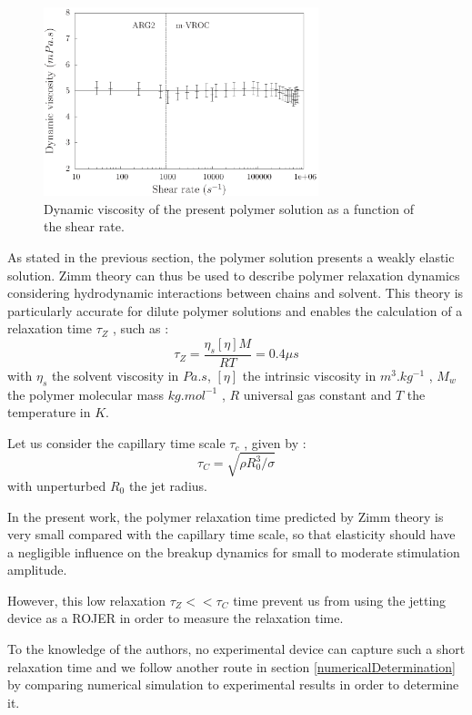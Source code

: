 \documentclass[twocolumn,10pt]{asme2ej}
\begin{document}
\begin{figure}[H]
    \centering
    \includegraphics[width=8cm]{./9651visco.eps}
    \caption{Dynamic viscosity of the present polymer solution as a function of the shear rate.}
    \label{beahaviorLaw}
\end{figure}

As stated in the previous section, the polymer solution presents a weakly elastic solution. Zimm theory can thus be used to describe polymer relaxation dynamics considering hydrodynamic interactions between chains and solvent. This theory is particularly accurate for dilute polymer solutions and enables the calculation of a relaxation time $\tau_Z$ , such as :
\begin{equation}
    \tau_Z = \frac{\eta_s [\eta] M}{RT} = 0.4 \mu s
    \label{zimm} 
\end{equation}
with $\eta_s$ the solvent viscosity in $Pa.s$, $[\eta]$ the intrinsic viscosity in $m^3.kg^{−1}$ , $M_w$ the
polymer molecular mass $kg.mol^{−1}$ , $R$ universal gas constant and $T$ the temperature in $K$.

Let us consider the capillary time scale $\tau_c$ , given by :
\begin{equation}
    \tau_C= \sqrt{\rho R_0^3 / \sigma}
\end{equation}
with unperturbed $R_0$ the jet radius. 

In the present work, the polymer relaxation time predicted by Zimm theory is very small compared with the capillary time scale, so that elasticity should have a negligible influence on the breakup dynamics for small to moderate stimulation amplitude. 

However, this low relaxation $\tau_Z<<\tau_C$ time prevent us from using the jetting device as a ROJER \cite{keshavarz2015studying} in order to measure the relaxation time. 

To the knowledge of the authors, no experimental device can capture such a short relaxation time and we follow another route in section \ref{numericalDetermination} by comparing numerical simulation to experimental results in order to determine it.
\end{document}
